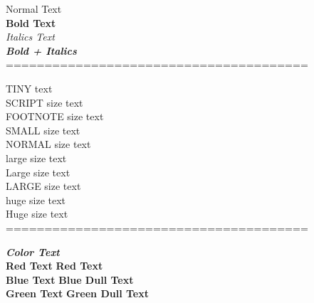 \documentclass{article}
\begin{document}
	
	Normal Text \\
	
	\textbf{Bold Text}\\
	
	\textit{Italics Text}\\
	
	\textbf{\textit{Bold + Italics}}\\
	=======================================							
							
	\tiny{TINY text}\\
	
	\scriptsize{SCRIPT size text}\\
	
	\footnotesize{FOOTNOTE size text}\\
	
	\small{SMALL size text}\\

	\normalsize{NORMAL size text}\\
	
	\large{large size text}\\
	
	\Large{Large size text}\\
	
	\LARGE{LARGE size text}\\
	
	\huge{huge size text}\\
	
	\Huge{Huge size text}\\
	
	\normalsize
	=======================================							
													
	\textbf{\Large{\textit{Color Text}}}\\
	
	\Large\textbf{\color{red} Red Text}		\hspace{3cm}	\Large\textbf{\color{red!50} Red Text}\\
	
	\Large\textbf{\color{blue} Blue Text}	\hspace{2.9cm}	\Large\textbf{\color{blue!50} Blue Dull Text}\\
	
	\Large\textbf{\color{green} Green Text}	\hspace{2.5cm}	\Large\textbf{\color{green!50} Green Dull Text}
	
\end{document}
